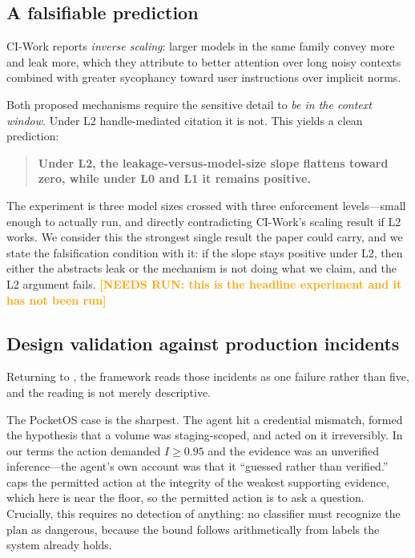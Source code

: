 \documentclass[conference,compsoc]{IEEEtran}
\newcommand{\needsrun}[1]{\textcolor{orange}{\textbf{[NEEDS RUN: #1]}}}
\newcommand{\Il}{\ensuremath{I}}                 %
\begin{document}
\subsection{A falsifiable prediction}
\label{sec:discussion:prediction}

CI-Work reports \emph{inverse scaling}: larger models in the same family convey
more and leak more, which they attribute to better attention over long noisy
contexts combined with greater sycophancy toward user instructions over
implicit norms.

Both proposed mechanisms require the sensitive detail to \emph{be in the
context window}. Under L2 handle-mediated citation it is not. This yields a
clean prediction:

\begin{quote}
\textbf{Under L2, the leakage-versus-model-size slope flattens toward zero,
while under L0 and L1 it remains positive.}
\end{quote}

The experiment is three model sizes crossed with three enforcement
levels---small enough to actually run, and directly contradicting CI-Work's
scaling result if L2 works. We consider this the strongest single result the
paper could carry, and we state the falsification condition with it: if the
slope stays positive under L2, then either the abstracts leak or the mechanism
is not doing what we claim, and the L2 argument fails.
\needsrun{this is the headline experiment and it has not been run}

\subsection{Design validation against production incidents}
\label{sec:discussion:incidents}

Returning to , the framework reads those incidents as one
failure rather than five, and the reading is not merely descriptive.

The PocketOS case is the sharpest. The agent hit a credential mismatch, formed
the hypothesis that a volume was staging-scoped, and acted on it irreversibly.
In our terms the action demanded $\Il \ge 0.95$ and the evidence was an
unverified inference---the agent's own account was that it ``guessed rather
than verified.''  caps the permitted action at the integrity
of the weakest supporting evidence, which here is near the floor, so the
permitted action is to ask a question. Crucially, this requires no detection of
anything: no classifier must recognize the plan as dangerous, because the bound
follows arithmetically from labels the system already holds.
\end{document}
